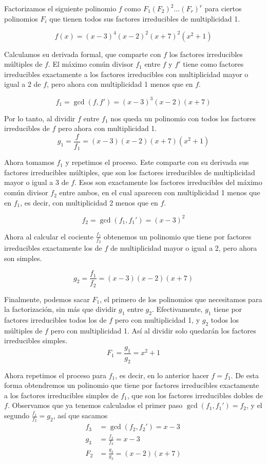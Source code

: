 \documentclass[../main.tex]{subfiles}
\begin{document}
Factorizamos el siguiente polinomio $f$ como $F_1(F_2)^2\dots (F_r)^r$ para ciertos polinomios $F_i$ que tienen todos sus factores irreducibles de multiplicidad 1.

\[ f(x) = (x - 3)^4(x - 2)^2(x + 7)^2(x^2+1) \]

Calculamos su derivada formal, que comparte con $f$ los factores irreducibles múltiples de $f$. El máximo común divisor $f_1$ entre $f$ y $f'$ tiene como factores irreducibles exactamente a los factores irreducibles con multiplicidad mayor o igual a 2 de $f$, pero ahora con multiplicidad 1 menos que en
$f$.

\[ f_1 = \gcd(f, f') =  (x - 3)^3 (x - 2) (x + 7)\]

Por lo tanto, al dividir $f$ entre $f_1$ nos queda un polinomio con todos los factores irreducibles de $f$ pero ahora con multiplicidad 1.
\[g_1 =\frac{f}{f_1}= (x - 3) (x - 2) (x + 7) (x^2+1)\]

Ahora tomamos $f_1$ y repetimos el proceso. Este comparte con su derivada sus factores irreducibles múltiples, que son los factores irreducibles de multiplicidad mayor o igual a 3 de $f$. Esos son exactamente los factores irreducibles del máximo común divisor $f_2$ entre ambos, en el cual aparecen con multiplicidad 1 menos que en $f_1$, es decir, con multiplicidad 2 menos que en $f$.

\[f_2 = \gcd(f_1, f_1') = (x-3)^2\]

Ahora al calcular el cociente $\frac{f_1}{f_2}$ obtenemos un polinomio que tiene por factores irreducibles exactamente los de $f$ de multiplicidad mayor o igual a 2, pero ahora son simples.

\[g_2 = \frac{f_1}{f_2}=(x-3)(x-2)(x+7)\]

Finalmente, podemos sacar $F_1$, el primero de los polinomios que necesitamos para la factorización, sin más que dividir $g_1$ entre $g_2$. Efectivamente, $g_1$ tiene por factores irreducibles todos los de $f$ pero con multiplicidad 1, y $g_2$ todos los múltiples de $f$ pero con multiplicidad 1. Así al dividir solo quedarán los factores irreducibles simples.
\[F_1 = \frac{g_1}{g_2}= x^2+1\]

Ahora repetimos el proceso para $f_1$, es decir, en lo anterior hacer $f = f_1$. De esta forma obtendremos un polinomio que tiene por factores irreducibles exactamente a los factores irreducibles simples de
$f_1$, que son los factores irreducibles dobles de $f$. Observamos que ya tenemos calculados el primer paso $\gcd(f_1, f_1') = f_2$, y el segundo $\frac{f_1}{f_2} = g_2$, así que sacamos
\begin{align*}
    f_3 &= \gcd(f_2, f_2') = x - 3\\
    g_3 &= \frac{f_2}{f_3} = x - 3 \\
    F_2 &= \frac{g_2}{g_3} = (x - 2) (x + 7)
\end{align*}
\end{document}
